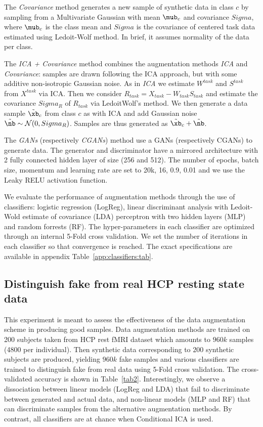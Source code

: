 The \emph{Covariance} method generates a new sample of
synthetic data in class $c$ by sampling from a Multivariate Gaussian
with mean $\mub_c$ and covariance $Sigma$, where $\mub_c$ is the
class mean and $Sigma$ is the covariance of centered task data
estimated using Ledoit-Wolf method.
%
In brief, it assumes normality of the data per class.

The \emph{ICA + Covariance} method combines the augmentation
methods \emph{ICA} and \emph{Covariance}: samples are drawn following
the ICA approach, but with some additive non-isotropic Gaussian noise.
%
As in \emph{ICA} we estimate $W^{task}$ and $S^{task}$ from
$X^{task}$ via ICA.
%
Then we consider $R_{task} = X_{task} - W_{task} S_{task}$ and estimate the
covariance $Sigma_R$ of $R_{task}$ via LedoitWolf's method.
%
We then generate a data sample $\tilde{\xb}_c$ from class $c$ as with ICA and add
Gaussian noise $\tilde{\nb} \sim \mathcal{N}(0,Sigma_R)$.
%
Samples are thus generated as $\tilde{\xb}_c + \tilde{\nb}$.

The \emph{GANs} (respectively \emph{CGANs}) method use a GANs (respectively CGANs) to generate data. The generator and discriminator have a mirrored architecture with 2 fully connected hidden layer of size (256 and 512).  The number of epochs, batch size, momentum and learning rate are set to 20k, 16, 0.9, 0.01 and we use the Leaky RELU activation function.

We evaluate the performance of augmentation methods through the use of classifiers: logistic regression (LogReg), linear
discriminant analysis with Ledoit-Wold estimate of covariance (LDA) perceptron
with two hidden layers (MLP) and random forrests (RF).
The hyper-parameters in each classifier are optimized through an internal 5-Fold
cross validation. We set the number of iterations in each classifier so that
convergence is reached. The exact specifications are available in appendix Table~\ref{app:classifiers:tab}.


 
\subsection{Distinguish fake from real HCP resting state data}
This experiment is meant to assess the effectiveness of the data
augmentation scheme in producing good samples.
Data augmentation methods are trained on 200 subjects taken from HCP rest fMRI
dataset which amounts to $960k$ samples (4800
per individual). Then synthetic
data corresponding to $200$ synthetic subjects are produced, yielding
$960k$ fake samples and various classifiers are trained to distinguish fake from
real data using 5-Fold cross validation. The cross-validated accuracy is shown
in Table~\ref{tab2}.
Interestingly, we observe a dissociation between linear models (LogReg
and LDA) that fail to discriminate between generated and actual data,
and non-linear models (MLP and RF) that can discriminate samples from
the alternative augmentation methods.
%
By contrast, all classifiers are at chance when Conditional ICA is used.

